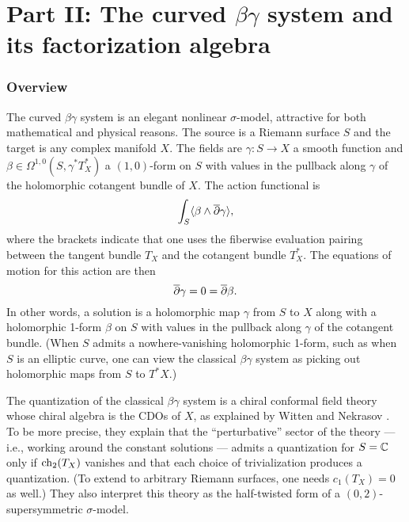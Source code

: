 \part*{Part II: The curved $\beta\gamma$ system and its factorization algebra}


\section{Overview}

The curved $\beta\gamma$ system is an elegant nonlinear $\sigma$-model,
attractive for both mathematical and physical reasons.
The source is a Riemann surface $S$ and the target is any complex manifold $X$.
The fields are $\gamma: S \to X$ a smooth function and 
$\beta \in \Omega^{1,0}(S,\gamma^*T^*_X)$ a $(1,0)$-form on $S$ 
with values in the pullback along $\gamma$ of the holomorphic cotangent bundle of $X$.
The action functional is 
\[\int_S \langle \beta \wedge \overline{\partial} \gamma \rangle, \]
where the brackets indicate that one uses the fiberwise evaluation pairing between the tangent bundle $T_X$ and the cotangent bundle $T^*_X$.
The equations of motion for this action are then
\[ 
\overline{\partial} \gamma = 0 = \overline{\partial} \beta. 
\]
In other words, a solution is a holomorphic map $\gamma$ from $S$ to $X$ along with a holomorphic 1-form $\beta$ on $S$ with values in the pullback along $\gamma$ of the cotangent bundle. 
(When $S$ admits a nowhere-vanishing holomorphic 1-form, such as when $S$ is an elliptic curve,
one can view the classical $\beta\gamma$ system as picking out holomorphic maps from $S$ to $T^*X$.)

The quantization of the classical $\beta\gamma$ system is a chiral conformal field theory whose chiral algebra is the CDOs of $X$,
as explained by Witten \cite{WittenCDO} and Nekrasov \cite{Nek}.
To be more precise, they explain that the ``perturbative'' sector of the 
theory --- i.e., working around the constant solutions --- admits a quantization for $S = \mathbb C$ only if ${\rm ch}_2(T_X)$ vanishes and that each choice of trivialization produces a quantization.
(To extend to arbitrary Riemann surfaces, one needs $c_1(T_X) = 0$ as well.)
They also interpret this theory as the half-twisted form of a $(0,2)$-supersymmetric $\sigma$-model.

